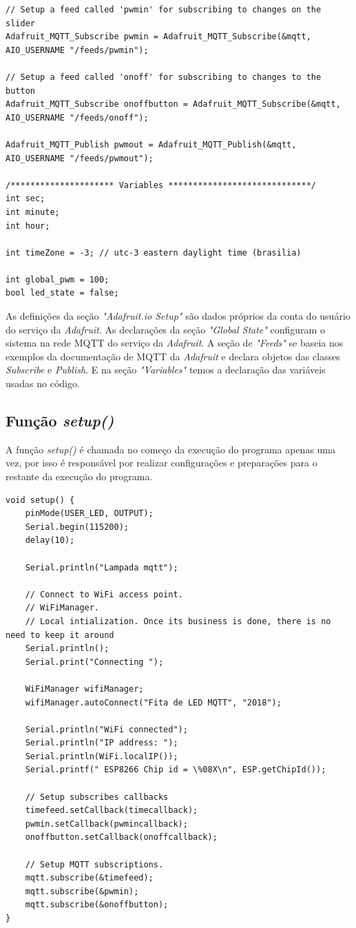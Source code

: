 \begin{lstlisting}
// Setup a feed called 'pwmin' for subscribing to changes on the slider
Adafruit_MQTT_Subscribe pwmin = Adafruit_MQTT_Subscribe(&mqtt, AIO_USERNAME "/feeds/pwmin");

// Setup a feed called 'onoff' for subscribing to changes to the button
Adafruit_MQTT_Subscribe onoffbutton = Adafruit_MQTT_Subscribe(&mqtt, AIO_USERNAME "/feeds/onoff");

Adafruit_MQTT_Publish pwmout = Adafruit_MQTT_Publish(&mqtt, AIO_USERNAME "/feeds/pwmout");

/********************* Variables *****************************/
int sec;
int minute;
int hour;

int timeZone = -3; // utc-3 eastern daylight time (brasilia)

int global_pwm = 100;
bool led_state = false;

\end{lstlisting}

As definições da seção \textit{"Adafruit.io Setup"} são dados próprios da conta do usuário do serviço da \textit{Adafruit}. As declarações da seção \textit{"Global State"} configuram o sistema na rede MQTT do serviço da \textit{Adafruit}. A seção de \textit{"Feeds"} se baseia nos exemplos da documentação de MQTT da \textit{Adafruit} e declara objetos das classes \textit{Subscribe} e \textit{Publish}. E na seção \textit{"Variables"} temos a declaração das variáveis usadas no código.

\subsection{Função \textit{setup()}}

A função \textit{setup()} é chamada no começo da execução do programa apenas uma vez, por isso é responsável por realizar configurações e preparações para o restante da execução do programa.

\begin{lstlisting}
void setup() {
    pinMode(USER_LED, OUTPUT);
    Serial.begin(115200);
    delay(10);

    Serial.println("Lampada mqtt");

    // Connect to WiFi access point. 
    // WiFiManager.
    // Local intialization. Once its business is done, there is no need to keep it around
    Serial.println();
    Serial.print("Connecting ");

    WiFiManager wifiManager;
    wifiManager.autoConnect("Fita de LED MQTT", "2018");

    Serial.println("WiFi connected");
    Serial.println("IP address: "); 
    Serial.println(WiFi.localIP());
    Serial.printf(" ESP8266 Chip id = \%08X\n", ESP.getChipId());
    
    // Setup subscribes callbacks
    timefeed.setCallback(timecallback);
    pwmin.setCallback(pwmincallback);
    onoffbutton.setCallback(onoffcallback);

    // Setup MQTT subscriptions.
    mqtt.subscribe(&timefeed);
    mqtt.subscribe(&pwmin);
    mqtt.subscribe(&onoffbutton);
}
\end{lstlisting}

